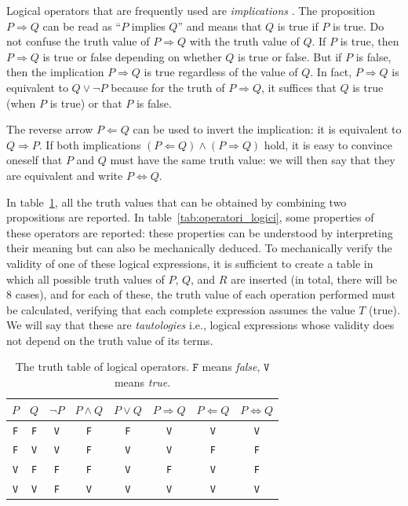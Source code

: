 Logical operators that are frequently used are \emph{implications}%
%
. The proposition $P\Rightarrow Q$ can be read as ``$P$ implies $Q$'' and means that $Q$ is true if $P$ is true. Do not confuse the truth value of $P\Rightarrow Q$ with the truth value of $Q$. If $P$ is true, then $P\Rightarrow Q$ is true or false depending on whether $Q$ is true or false. But if $P$ is false, then the implication $P\Rightarrow Q$ is true regardless of the value of $Q$. In fact, $P\Rightarrow Q$ is equivalent to $Q \lor \lnot P$ because for the truth of $P\Rightarrow Q$, it suffices that $Q$ is true (when $P$ is true) or that $P$ is false.

The reverse arrow $P\Leftarrow Q$ can be used to invert the implication: it is
equivalent to $Q \Rightarrow P$. If both implications $(P \Leftarrow Q) \land
(P\Rightarrow Q)$ hold, it is easy to convince oneself that $P$ and $Q$ must
have the same truth value: we will then say that they are equivalent and write
$P \Leftrightarrow Q$.

In table~\ref{tab:verita_operatori_logici}, all the truth values that can be
obtained by combining two propositions are reported. In
table~\ref{tab:operatori_logici}, some properties of these operators are
reported: these properties can be understood by interpreting their meaning but
can also be mechanically deduced. To mechanically verify the validity of one of
these logical expressions, it is sufficient to create a table in which all
possible truth values of $P$, $Q$, and $R$ are inserted (in total, there will be
$8$ cases), and for each of these, the truth value of each operation performed
must be calculated, verifying that each complete expression assumes the value
$T$ (true). We will say that these are \emph{tautologies}%
%
%
i.e., logical expressions whose validity does not depend on the truth value of
its terms.

\begin{table}
\begin{center}
  \begin{tabular}{cc|cccccc}
    $P$ & $Q$ & $\neg P$ & $P\land Q$ & $P\lor Q$ & $P\Rightarrow Q$ &
    $P\Leftarrow Q$ & $P\Leftrightarrow Q$ \\\hline
    \texttt{F} & \texttt{F} & \texttt{V} & \texttt{F} & \texttt{F} & \texttt{V} & \texttt{V} & \texttt{V} \\
    \texttt{F} & \texttt{V} & \texttt{V} & \texttt{F} & \texttt{V} & \texttt{V} & \texttt{F} & \texttt{F} \\
    \texttt{V} & \texttt{F} & \texttt{F} & \texttt{F} & \texttt{V} & \texttt{F} & \texttt{V} & \texttt{F} \\
    \texttt{V} & \texttt{V} & \texttt{F} & \texttt{V} & \texttt{V} & \texttt{V} & \texttt{V} & \texttt{V} \\
    \end{tabular}
\end{center}
\caption{The truth table of logical operators. 
$\texttt{F}$ means \emph{false}, $\texttt{V}$ means \emph{true}.}
\label{tab:verita_operatori_logici}
\end{table}

